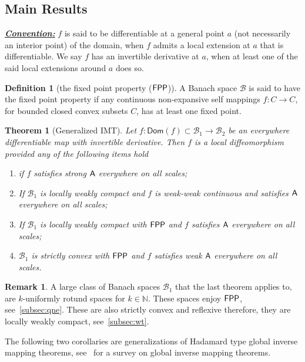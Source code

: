\documentclass[a4, 12pt,leqno]{amsart}
\theoremstyle{plain}
\newtheorem{theorem}{Theorem}
\theoremstyle{definition}
\newtheorem{definition}[lemma]{Definition}
\newtheorem{remark}[lemma]{Remark}
\theoremstyle{remark}
\numberwithin{equation}{section}
\newcommand{\B}{\mathcal{B}}
\begin{document}
\subsection{Main Results}
\hfill\newline
\noindent\underline{\small \emph{\textbf{Convention:}}} $f$ is said to be differentiable at a general point $a$ (not necessarily an interior point) of the domain, when $f$ admits a local extension at $a$ that is differentiable. We say $f$ has an invertible derivative at $a$, when at least one of the said local extensions around $a$ does so. 
\begin{definition}[the fixed point property (${\sf FPP}$)]
	A Banach space $\B$ is said to have the fixed point property if any continuous non-expansive self mappings $f:C \to C$, for bounded closed convex subsets $C$, has at least one fixed point.
\end{definition}
\begin{theorem}[Generalized IMT]\label{thrm:main-1}
Let $f: \mathsf{Dom}(f) \subset \B_1 \to \B_2$ be an everywhere differentiable map with invertible derivative. Then $f$ is a local diffeomorphism provided any of the following items hold
	\begin{enumerate}
		\item if $f$ satisfies strong ${\sf A}$ everywhere on all scales;
		\item If $\B_1$ is locally weakly compact and $f$ is weak-weak continuous and satisfies ${\sf A}$ everywhere on all scales;
		\item If $\B_1$ is locally weakly compact with ${\sf FPP}$ and $f$ satisfies ${\sf A}$ everywhere on all scales; 
		\item $\B_1$ is strictly convex with ${\sf FPP}$ and $f$ satisfies weak ${\sf A}$ everywhere on all scales. 
	\end{enumerate} 
\end{theorem}
\begin{remark}
A large class of Banach spaces $\B_1$ that the last theorem applies to, are $k$-uniformly rotund spaces for $k \in \mathbb{N}$. These spaces enjoy ${\sf FPP}$, see~\textsection\thinspace\ref{subsec:qne}. These are also strictly convex and reflexive therefore, they are locally weakly compact, see~\textsection\thinspace\ref{subsec:wt}. 
\end{remark}
\par The following two corollaries are generalizations of Hadamard type global inverse mapping theorems, see~\cite{Gutu} for a survey on global inverse mapping theorems. 
\end{document}
